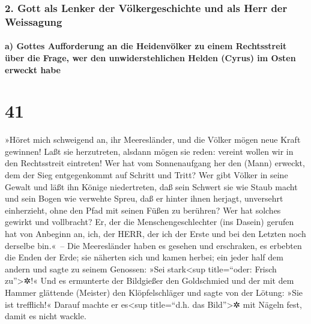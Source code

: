 \hypertarget{gott-als-lenker-der-vuxf6lkergeschichte-und-als-herr-der-weissagung}{%
\subsubsection{2. Gott als Lenker der Völkergeschichte und als Herr der
Weissagung}\label{gott-als-lenker-der-vuxf6lkergeschichte-und-als-herr-der-weissagung}}

\hypertarget{a-gottes-aufforderung-an-die-heidenvuxf6lker-zu-einem-rechtsstreit-uxfcber-die-frage-wer-den-unwiderstehlichen-helden-cyrus-im-osten-erweckt-habe}{%
\paragraph{a) Gottes Aufforderung an die Heidenvölker zu einem
Rechtsstreit über die Frage, wer den unwiderstehlichen Helden (Cyrus) im
Osten erweckt
habe}\label{a-gottes-aufforderung-an-die-heidenvuxf6lker-zu-einem-rechtsstreit-uxfcber-die-frage-wer-den-unwiderstehlichen-helden-cyrus-im-osten-erweckt-habe}}

\hypertarget{section-40}{%
\section{41}\label{section-40}}

»Höret mich schweigend an, ihr Meeresländer, und die
Völker mögen neue Kraft gewinnen! Laßt sie herzutreten, alsdann mögen
sie reden: vereint wollen wir in den Rechtsstreit eintreten!
Wer hat vom Sonnenaufgang her den (Mann) erweckt, dem der
Sieg entgegenkommt auf Schritt und Tritt? Wer gibt Völker in seine
Gewalt und läßt ihn Könige niedertreten, daß sein Schwert sie wie Staub
macht und sein Bogen wie verwehte Spreu, daß er hinter
ihnen herjagt, unversehrt einherzieht, ohne den Pfad mit seinen Füßen zu
berühren? Wer hat solches gewirkt und vollbracht? Er, der
die Menschengeschlechter (ins Dasein) gerufen hat von Anbeginn an, ich,
der HERR, der ich der Erste und bei den Letzten noch derselbe bin.«~--
Die Meeresländer haben es gesehen und erschraken, es
erbebten die Enden der Erde; sie näherten sich und kamen herbei;
ein jeder half dem andern und sagte zu seinem Genossen:
»Sei stark\textless sup title=``oder: Frisch zu''\textgreater✲!«
Und es ermunterte der Bildgießer den Goldschmied und der
mit dem Hammer glättende (Meister) den Klöpfelschläger und sagte von der
Lötung: »Sie ist trefflich!« Darauf machte er es\textless sup
title=``d.h. das Bild''\textgreater✲ mit Nägeln fest, damit es nicht
wackle.

